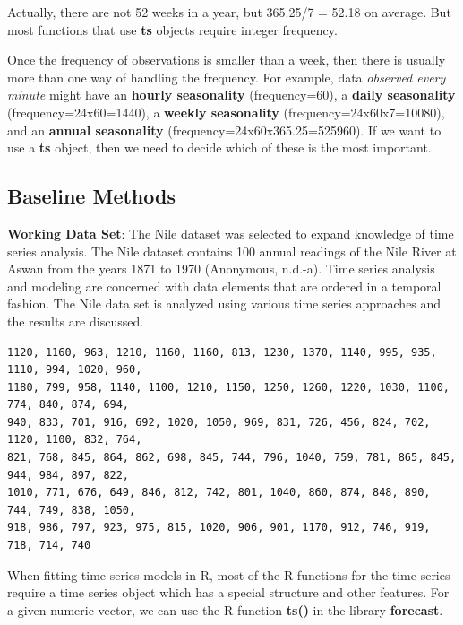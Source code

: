 \documentclass[
]{book}
\begin{document}
Actually, there are not 52 weeks in a year, but 365.25/7 = 52.18 on average. But most functions that use \textbf{ts} objects require integer frequency.

Once the frequency of observations is smaller than a week, then there is usually more than one way of handling the frequency. For example, data \emph{\color{red}observed every minute} might have an \textbf{hourly seasonality} (frequency=60), a \textbf{daily seasonality} (frequency=24x60=1440), a \textbf{weekly seasonality} (frequency=24x60x7=10080), and an \textbf{annual seasonality} (frequency=24x60x365.25=525960). If we want to use a \textbf{ts} object, then we need to decide which of these is the most important.

\hypertarget{baseline-methods}{%
\subsection{Baseline Methods}\label{baseline-methods}}

\textbf{Working Data Set}: The Nile dataset was selected to expand knowledge of time series analysis. The Nile dataset contains 100 annual readings of the Nile River at Aswan from the years 1871 to 1970 (Anonymous, n.d.-a). Time series analysis and modeling are concerned with data elements that are ordered in a temporal fashion. The Nile data set is analyzed using various time series approaches and the results are discussed.

\begin{verbatim}
1120, 1160, 963, 1210, 1160, 1160, 813, 1230, 1370, 1140, 995, 935, 1110, 994, 1020, 960,
1180, 799, 958, 1140, 1100, 1210, 1150, 1250, 1260, 1220, 1030, 1100, 774, 840, 874, 694,
940, 833, 701, 916, 692, 1020, 1050, 969, 831, 726, 456, 824, 702, 1120, 1100, 832, 764, 
821, 768, 845, 864, 862, 698, 845, 744, 796, 1040, 759, 781, 865, 845, 944, 984, 897, 822,
1010, 771, 676, 649, 846, 812, 742, 801, 1040, 860, 874, 848, 890, 744, 749, 838, 1050, 
918, 986, 797, 923, 975, 815, 1020, 906, 901, 1170, 912, 746, 919, 718, 714, 740
\end{verbatim}

When fitting time series models in R, most of the R functions for the time series require a time series object which has a special structure and other features. For a given numeric vector, we can use the R function \textbf{ts()} in the library \textbf{forecast}.
\end{document}
